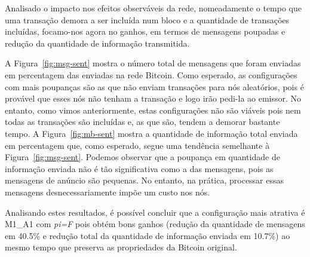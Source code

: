 Analisado o impacto nos efeitos observáveis da rede, nomeadamente o tempo que uma transação demora a ser incluída num bloco e a quantidade de transações incluídas, focamo-nos agora no ganhos, em termos de mensagens poupadas e redução da quantidade de informação transmitida.


A Figura~\ref{fig:msg-sent} mostra o número total de mensagens que foram enviadas em percentagem das enviadas na rede Bitcoin.
Como esperado, as configurações com mais poupanças são as que não enviam transações para nós aleatórios, pois é provável que esses nós não tenham a transação e logo irão pedi-la ao emissor.
No entanto, como vimos anteriormente, estas configurações não são viáveis pois nem todas as transações são incluídas e, as que são, tendem a demorar bastante tempo.
A Figura~\ref{fig:mb-sent} mostra a quantidade de informação total enviada em percentagem que, como esperado, segue uma tendência semelhante à Figura~\ref{fig:msg-sent}.
Podemos observar que a poupança em quantidade de informação enviada não é tão significativa como a das mensagens, pois as mensagens de anúncio são pequenas.
No entanto, na prática, processar essas mensagens desnecessariamente impõe um custo nos nós.

Analisando estes resultados, é possível concluir que a configuração mais atrativa é M1\_A1 com \textsl{pi=F} pois obtém bons ganhos 
(redução da quantidade de mensagens em 40.5\% e  redução total da quantidade de informação enviada em 10.7\%) ao mesmo tempo que preserva as propriedades da Bitcoin original.

